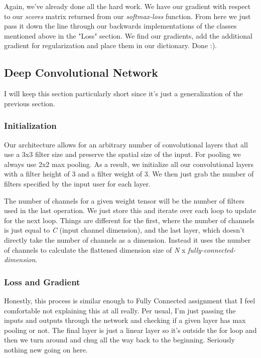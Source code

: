 \documentclass[12pt]{article}
\begin{document}
Again, we've already done all the hard work. We have our gradient with respect to our \emph{scores} matrix returned 
from our \emph{softmax-loss} function. From here we just pass it down the line through our backwards
implementations of the classes mentioned above in the "Loss" section. We find our gradients, add
the additional gradient for regularization and place them in our dictionary. Done :). 

\subsection{Deep Convolutional Network}
I will keep this section particularly short since it's just a generalization of the previous 
section.

\subsubsection{Initialization}
Our architecture allows for an arbitrary number of convolutional layers that all 
use a 3x3 filter size and preserve the spatial size of the input. For pooling we always 
use 2x2 max pooling. As a result, we initialize all our convolutional layers with a filter 
height of 3 and a filter weight of 3. We then just grab the number of filters specified 
by the input user for each layer. 

The number of channels for a given weight tensor will be the number of filters used in the last 
operation. We just store this and iterate over each loop to update for the next loop. Things are 
different for the first, where the number of channels is just equal to \emph{C} (input channel dimension),
and the last layer, which doesn't directly take the number of channels as a dimension. Instead it 
uses the number of channels to calculate the flattened dimension size of \emph{N} x \emph{fully-connected-dimension}. 

\subsubsection{Loss and Gradient}
Honestly, this process is similar enough to Fully Connected assignment that I feel comfortable 
not explaining this at all really. Per usual, I'm just passing the inputs and outputs through the 
network and checking if a given layer has max pooling or not. The final layer is just a linear 
layer so it's outside the for loop and then we turn around and chug all the way back to the beginning. 
Seriously nothing new going on here. 
\end{document}
